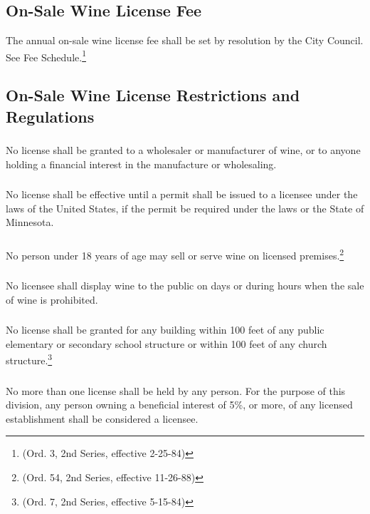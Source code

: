 \subsection{On-Sale Wine License Fee}
The annual on-sale wine license fee shall be set by resolution by the City Council. See Fee Schedule.\footnote{(Ord. 3, 2nd Series, effective 2-25-84)}
\subsection{On-Sale Wine License Restrictions and Regulations}
\subsubsection{}
No license shall be granted to a wholesaler or manufacturer of wine, or to anyone holding a financial interest in the manufacture or wholesaling.
\subsubsection{}
No license shall be effective until a permit shall be issued to a licensee under the laws of the United States, if the permit be required under the laws or the State of Minnesota.
\subsubsection{}
No person under 18 years of age may sell or serve wine on licensed premises.\footnote{(Ord. 54, 2nd Series, effective 11-26-88)}
\subsubsection{}
No licensee shall display wine to the public on days or during hours when the sale of wine is prohibited.
\subsubsection{}
No license shall be granted for any building within 100 feet of any public elementary or secondary school structure or within 100 feet of any church structure.\footnote{(Ord. 7, 2nd Series, effective 5-15-84)}
\subsubsection{}
No more than one license shall be held by any person.  For the purpose of this division, any person owning a beneficial interest of 5\%, or more, of any licensed establishment shall be considered a licensee.
